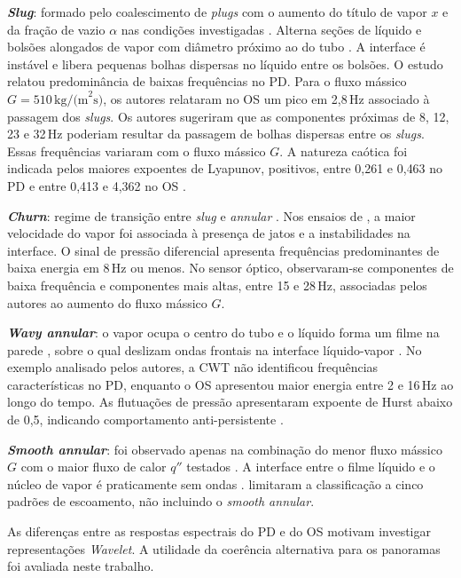 \textbf{\textit{Slug}}: formado pelo coalescimento de \textit{plugs} com o aumento do título de
vapor $x$ e da fração de vazio $\alpha$ nas condições investigadas
\cite{deoliveira2021}. Alterna seções de
líquido e bolsões alongados de vapor com diâmetro próximo ao do tubo
\cite{dias2025knn,deoliveira2021}. A interface é instável e libera
pequenas bolhas dispersas no líquido entre os bolsões. O estudo relatou predominância
de baixas frequências no PD. Para o fluxo mássico $G=510\,\text{kg/(m}^2\text{s)}$, os autores
relataram no OS um pico em 2{,}8\,Hz associado à passagem dos \textit{slugs}. Os autores
sugeriram que as componentes próximas de 8, 12, 23 e 32\,Hz poderiam resultar da passagem
de bolhas dispersas entre os \textit{slugs}. Essas frequências variaram com o fluxo mássico $G$.
A natureza caótica foi indicada pelos maiores expoentes de Lyapunov, positivos, entre 0{,}261
e 0{,}463 no PD e entre 0{,}413 e 4{,}362 no OS \cite{deoliveira2021}.

\textbf{\textit{Churn}}: regime de transição entre \textit{slug} e \textit{annular}
\cite{dias2025knn}.
Nos ensaios de , a maior velocidade do vapor foi associada à presença de
jatos e a instabilidades na interface. O sinal de pressão diferencial apresenta
frequências predominantes de baixa energia em 8\,Hz ou menos. No sensor óptico,
observaram-se componentes de baixa frequência e componentes mais altas, entre
15 e 28\,Hz, associadas pelos autores ao aumento do fluxo mássico $G$.


\textbf{\textit{Wavy annular}}: o vapor ocupa o centro
do tubo e o líquido forma um filme na parede
\cite{dias2025knn,deoliveira2021}, sobre o qual deslizam ondas frontais na interface
líquido-vapor \cite{deoliveira2021}. No exemplo analisado pelos autores, a CWT não
identificou frequências características no PD, enquanto o OS apresentou maior energia
entre 2 e 16\,Hz ao longo do tempo.
As flutuações de pressão apresentaram expoente de Hurst abaixo de 0{,}5, indicando
comportamento anti-persistente \cite{deoliveira2021}.

\textbf{\textit{Smooth annular}}: foi observado apenas na combinação
do menor fluxo mássico $G$ com o maior fluxo de calor $q''$ testados
\cite{deoliveira2021}. A interface entre o filme líquido e o núcleo de vapor é
praticamente sem ondas \cite{cheng2023}.
 limitaram a classificação a cinco padrões
de escoamento, não incluindo o \textit{smooth annular}.

As diferenças entre as respostas espectrais do PD e do OS
\cite{deoliveira2021} motivam investigar representações \textit{Wavelet}.
A utilidade da coerência alternativa para os panoramas foi avaliada neste trabalho.



